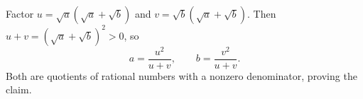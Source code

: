 Factor $u=\sqrt a(\sqrt a+\sqrt b)$ and $v=\sqrt b(\sqrt a+\sqrt b)$. Then $u+v=(\sqrt a+\sqrt b)^2>0$, so
\[
a=\dfrac{u^2}{u+v},\qquad b=\dfrac{v^2}{u+v}.
\]
Both are quotients of rational numbers with a nonzero denominator, proving the claim.
